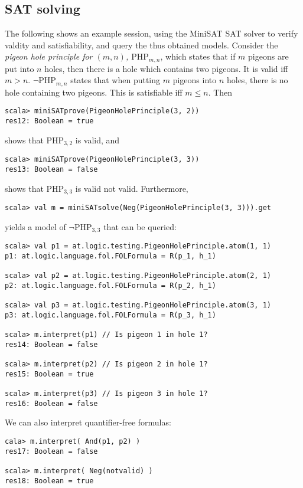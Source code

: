 \documentclass[a4paper, 11pt]{report}
\begin{document}
\subsection{SAT solving}
%
The following shows an example session, using the MiniSAT SAT solver
to verify valdity and satisfiability, and query the thus obtained models.
Consider the {\em pigeon hole principle for $(m, n)$, $\mathrm{PHP}_{m,n}$}, which states that if $m$ pigeons
are put into $n$ holes, then there is a hole which contains two pigeons. It is valid
iff $m>n$. $\neg\mathrm{PHP}_{m,n}$ states that when putting $m$ pigeons into $n$ holes, there
is no hole containing two pigeons. This is satisfiable iff $m\leq n$. Then
\begin{lstlisting}
scala> miniSATprove(PigeonHolePrinciple(3, 2))
res12: Boolean = true
\end{lstlisting}
shows that $\mathrm{PHP}_{3,2}$ is valid, and
\begin{lstlisting}
scala> miniSATprove(PigeonHolePrinciple(3, 3))
res13: Boolean = false
\end{lstlisting}
shows that $\mathrm{PHP}_{3,3}$ is valid not valid.
Furthermore,
\begin{lstlisting}
scala> val m = miniSATsolve(Neg(PigeonHolePrinciple(3, 3))).get
\end{lstlisting}
yields a model of $\neg\mathrm{PHP}_{3,3}$ that can be queried:
\begin{lstlisting}
scala> val p1 = at.logic.testing.PigeonHolePrinciple.atom(1, 1)
p1: at.logic.language.fol.FOLFormula = R(p_1, h_1)

scala> val p2 = at.logic.testing.PigeonHolePrinciple.atom(2, 1)
p2: at.logic.language.fol.FOLFormula = R(p_2, h_1)

scala> val p3 = at.logic.testing.PigeonHolePrinciple.atom(3, 1)
p3: at.logic.language.fol.FOLFormula = R(p_3, h_1)

scala> m.interpret(p1) // Is pigeon 1 in hole 1?
res14: Boolean = false

scala> m.interpret(p2) // Is pigeon 2 in hole 1?
res15: Boolean = true

scala> m.interpret(p3) // Is pigeon 3 in hole 1?
res16: Boolean = false
\end{lstlisting}
We can also interpret quantifier-free formulas:
\begin{lstlisting}
cala> m.interpret( And(p1, p2) )
res17: Boolean = false

scala> m.interpret( Neg(notvalid) )
res18: Boolean = true
\end{lstlisting}
%


\end{document}
